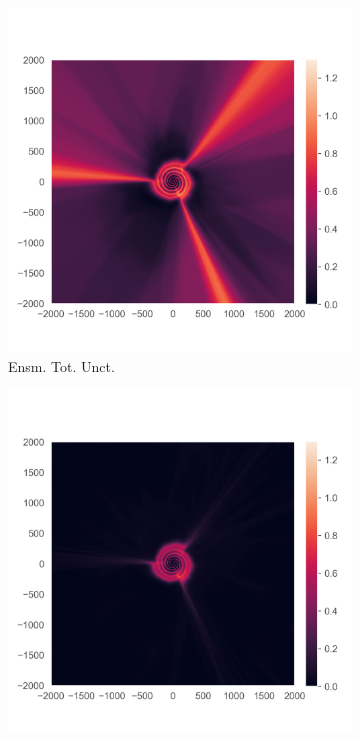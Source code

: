 \begin{figure}
\centering
\begin{subfigure}{0.22\textwidth}
  \centering
  \includegraphics[trim=42 45 15 55, clip, width=\linewidth]{plots/3a.png}
  \caption{Ensm. Tot. Unct.}
  \label{fig:3a}
\end{subfigure}
\begin{subfigure}{0.22\textwidth}
  \centering
  \includegraphics[trim=42 45 15 55, clip, width=\linewidth]{plots/3b.png}

\end{subfigure}
\end{figure}

